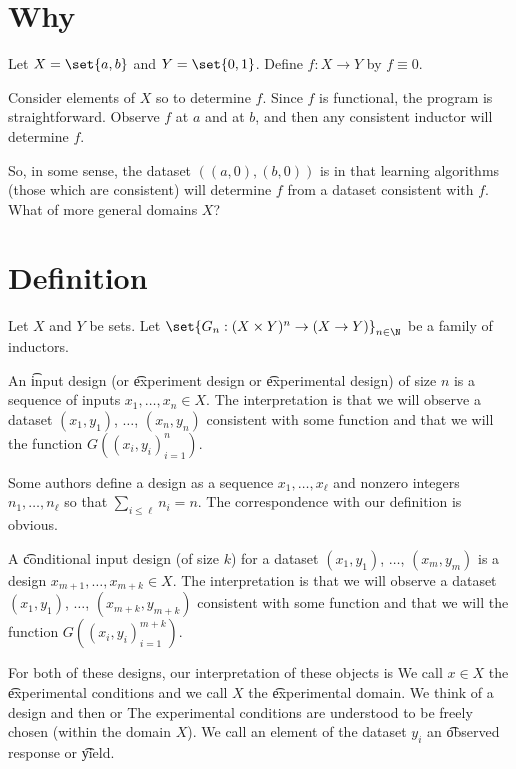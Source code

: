 

\section*{Why}

Let $X = \set{a, b}$ and $Y = \set{0, 1}$. Define $f: X \to Y$ by $f \equiv 0$.

Consider  elements of $X$ so to determine $f$.
Since $f$ is functional, the program is straightforward.
Observe $f$ at $a$ and at $b$, and then any consistent inductor will determine $f$.

So, in some sense, the dataset $((a,0), (b,0))$ is  in that  learning algorithms (those which are consistent) will determine $f$ from a dataset consistent with $f$.
What of more general domains $X$?

\section*{Definition}

Let $X$ and $Y$ be sets.
Let $\set{G_n: (X \times Y)^n \to (X \to Y)}_{n \in \N}$ be a family of inductors.

An \t{input design} (or \t{experiment design} or \t{experimental design}) of size $n$ is a sequence of inputs $x_1, \dots , x_n \in X$.
The interpretation is that we will observe a dataset $(x_1, y_1)$, $\dots $, $(x_n, y_n)$ consistent with some function and that we will  the function $G((x_i,y_i)_{i = 1}^{n})$.

Some authors define a design as a sequence $x_1, \dots , x_\ell $ and nonzero integers $n_1, \dots , n_{\ell }$ so that $\sum_{i \leq \ell } n_i = n$.
The correspondence with our definition is obvious.

A \t{conditional input design} (of size $k$) for a dataset $(x_1,y_1)$, $\dots $, $(x_m, y_m)$ is a design $x_{m+1}, \dots , x_{m+k} \in X$.
The interpretation is that we will observe a dataset $(x_1, y_1)$, $\dots $, $(x_{m+k}, y_{m+k})$ consistent with some function and that we will  the function $G((x_i,y_i)_{i = 1}^{m+k})$.

For both of these designs, our interpretation of these objects is 
We call $x \in X$ the \t{experimental conditions} and we call $X$ the \t{experimental domain}.
We think of  a design and then  or 
The experimental conditions are understood to be freely chosen (within the domain $X$).
We call an element of the dataset $y_i$ an \t{observed response} or \t{yield}.

